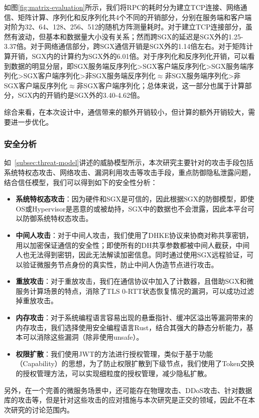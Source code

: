 如图\ref{fig:matrix-evaluation}所示，我们将RPC的耗时分为建立TCP连接、网络通信、矩阵计算、序列化和反序列化共4个不同的开销部分，分别在服务端和客户端对阶为32、64、128、256、512的随机方阵测量耗时。对于建立TCP连接部分，虽然有波动，但基本和数据量大小没有关系；然而跨SGX的延迟是SGX外的1.25-3.37倍。对于网络通信部分，跨SGX通信开销是SGX外的1.14倍左右。对于矩阵计算开销，SGX内的计算约为SGX外的6.01倍。对于序列化和反序列化开销，可以看到数据的明显分层，即SGX服务端反序列化>SGX客户端反序列化>SGX服务端序列化>SGX客户端序列化>非SGX服务端反序列化$\approx$非SGX服务端序列化>非SGX客户端反序列化$\approx$非SGX客户端序列化；总体来说，这一部分也属于计算部分，SGX内的开销约是SGX外的3.40-4.62倍。

综合来看，在本次设计中，通信带来的额外开销较小，但计算的额外开销较大，需要进一步优化。

\subsubsection{安全分析}

如~\cref{subsec:threat-model}讲述的威胁模型所示，本次研究主要针对的攻击手段包括系统特权态攻击、网络攻击、漏洞利用攻击等攻击手段，重点防御隐私泄露问题，结合信任模型，我们可以得到如下的安全性分析：

\begin{itemize}
    \item \textbf{系统特权态攻击}：因为硬件和SGX是可信的，因此根据SGX的防御模型，即使OS或Hypervisor是恶意的或被劫持，SGX中的数据也不会泄露，因此本平台可以防御系统特权态攻击。
    \item \textbf{中间人攻击}：对于中间人攻击，我们使用了DHKE协议来协商对称共享密钥，用以加密保证通信的安全性；即使所有的DH共享参数都被中间人截获，中间人也无法得到密钥，因此无法解读加密信息。同时通过使用SGX远程验证，可以验证微服务节点身份的真实性，防止中间人伪造节点进行攻击。
    \item \textbf{重放攻击}：对于重放攻击，我们在通信协议中加入了计数器，且借助SGX和微服务计算场景的特点，消除了TLS 0-RTT状态恢复情况的漏洞，可以成功过滤掉重放攻击。
    \item \textbf{内存攻击}：对于系统编程语言容易出现的悬垂指针、缓冲区溢出等漏洞带来的内存攻击，我们选择使用安全编程语言Rust，结合其强大的静态分析能力，基本可以消除这些漏洞（除非使用unsafe）。
    \item \textbf{权限扩散}：我们使用JWT的方法进行授权管理，类似于基于功能（Capability）的思想，为了防止权限扩散到下级节点，我们使用了Token交换的授权管理方法，可以实现细粒度的授权管理，减少隐私扩散。
\end{itemize}

另外，在一个完善的微服务场景中，还可能存在物理攻击、DDoS攻击、针对数据库的攻击等，但是针对这些攻击的应对措施与本次研究是正交的领域，因此不在本次研究的讨论范围内。
